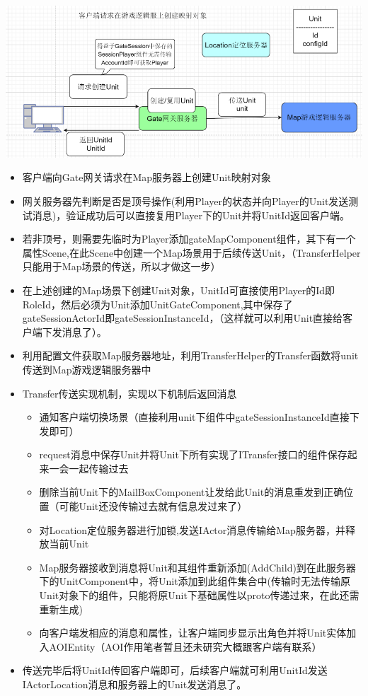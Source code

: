 \documentclass[9pt, b5paper]{article}
\begin{document}
\includegraphics[width=.9\linewidth]{./pic/readme_20230124_103930.png}
\begin{itemize}
\item 客户端向Gate网关请求在Map服务器上创建Unit映射对象
\item 网关服务器先判断是否是顶号操作(利用Player的状态并向Player的Unit发送测试消息)，验证成功后可以直接复用Player下的Unit并将UnitId返回客户端。
\item 若非顶号，则需要先临时为Player添加gateMapComponent组件，其下有一个属性Scene,在此Scene中创建一个Map场景用于后续传送Unit，（TransferHelper只能用于Map场景的传送，所以才做这一步）
\item 在上述创建的Map场景下创建Unit对象，UnitId可直接使用Player的Id即RoleId，然后必须为Unit添加UnitGateComponent,其中保存了gateSessionActorId即gateSessionInstanceId，（这样就可以利用Unit直接给客户端下发消息了）。
\item 利用配置文件获取Map服务器地址，利用TransferHelper的Transfer函数将unit传送到Map游戏逻辑服务器中
\item Transfer传送实现机制，实现以下机制后返回消息
\begin{itemize}
\item 通知客户端切换场景（直接利用unit下组件中gateSessionInstanceId直接下发即可）
\item request消息中保存Unit并将Unit下所有实现了ITransfer接口的组件保存起来一会一起传输过去
\item 删除当前Unit下的MailBoxComponent让发给此Unit的消息重发到正确位置（可能Unit还没传输过去就有信息发过来了）
\item 对Location定位服务器进行加锁,发送IActor消息传输给Map服务器，并释放当前Unit
\item Map服务器接收到消息将Unit和其组件重新添加(AddChild)到在此服务器下的UnitComponent中，将Unit添加到此组件集合中(传输时无法传输原Unit对象下的组件，只能将原Unit下基础属性以proto传递过来，在此还需重新生成)
\item 向客户端发相应的消息和属性，让客户端同步显示出角色并将Unit实体加入AOIEntity（AOI作用笔者暂且还未研究大概跟客户端有联系）
\end{itemize}
\item 传送完毕后将UnitId传回客户端即可，后续客户端就可利用UnitId发送IActorLocation消息和服务器上的Unit发送消息了。
\end{itemize}
\end{document}
